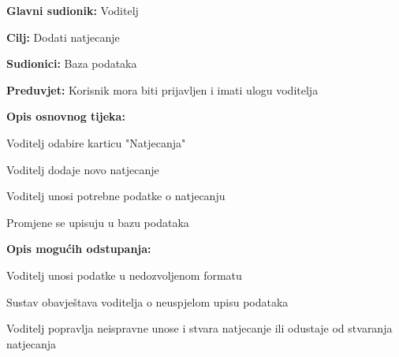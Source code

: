 					\noindent {}
					\begin{packed_item}
	
						\item \textbf{Glavni sudionik: }Voditelj
						\item  \textbf{Cilj:} Dodati natjecanje
						\item  \textbf{Sudionici:} Baza podataka
						\item  \textbf{Preduvjet:} Korisnik mora biti prijavljen i imati ulogu voditelja
						\item  \textbf{Opis osnovnog tijeka:}
						
						\item[] \begin{packed_enum}
	
							\item Voditelj odabire karticu "Natjecanja"
							\item Voditelj dodaje novo natjecanje
							\item Voditelj unosi potrebne podatke o natjecanju
							\item Promjene se upisuju u bazu podataka
						\end{packed_enum}
						
						\item  \textbf{Opis mogućih odstupanja:}
						
						\item[] \begin{packed_item}
	
							\item[3.a] Voditelj unosi podatke u nedozvoljenom formatu
							\item[] \begin{packed_enum}
								
								\item Sustav obavještava voditelja o neuspjelom upisu podataka
								\item Voditelj popravlja neispravne unose i stvara natjecanje ili odustaje od stvaranja natjecanja
								
							\end{packed_enum}
						\end{packed_item}
					\end{packed_item}
				
